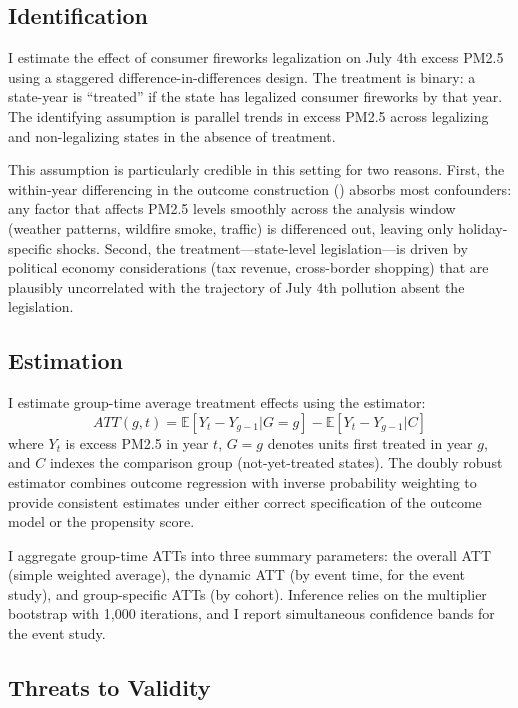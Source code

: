 \documentclass[12pt]{article}
\newcommand{\E}{\mathbb{E}}
\begin{document}
\subsection{Identification}

I estimate the effect of consumer fireworks legalization on July 4th excess PM2.5 using a staggered difference-in-differences design. The treatment is binary: a state-year is ``treated'' if the state has legalized consumer fireworks by that year. The identifying assumption is parallel trends in excess PM2.5 across legalizing and non-legalizing states in the absence of treatment.

This assumption is particularly credible in this setting for two reasons. First, the within-year differencing in the outcome construction () absorbs most confounders: any factor that affects PM2.5 levels smoothly across the analysis window (weather patterns, wildfire smoke, traffic) is differenced out, leaving only holiday-specific shocks. Second, the treatment---state-level legislation---is driven by political economy considerations (tax revenue, cross-border shopping) that are plausibly uncorrelated with the trajectory of July 4th pollution absent the legislation.

\subsection{Estimation}

I estimate group-time average treatment effects using the \citet{callaway2021difference} estimator:
\begin{equation}
ATT(g,t) = \E[Y_t - Y_{g-1} | G = g] - \E[Y_t - Y_{g-1} | C]
\label{eq:attgt}
\end{equation}
where $Y_t$ is excess PM2.5 in year $t$, $G = g$ denotes units first treated in year $g$, and $C$ indexes the comparison group (not-yet-treated states). The doubly robust estimator combines outcome regression with inverse probability weighting to provide consistent estimates under either correct specification of the outcome model or the propensity score.

I aggregate group-time ATTs into three summary parameters: the overall ATT (simple weighted average), the dynamic ATT (by event time, for the event study), and group-specific ATTs (by cohort). Inference relies on the multiplier bootstrap with 1,000 iterations, and I report simultaneous confidence bands for the event study.

\subsection{Threats to Validity}
\end{document}
